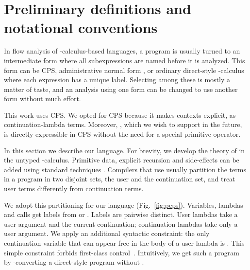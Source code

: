 \documentclass{LMCS}
\theoremstyle{definition} \newtheorem{property}[thm]{Property}
\begin{document}
\section{Preliminary definitions and notational conventions\label{sec:basics}}

\noindent In flow analysis of \lam-calculus-based languages, a program is usually turned
to an intermediate form where all subexpressions are named before it
is analyzed.  This form can be CPS, administrative normal form
\cite{conf/pldi/93/flanagan/anf}, or ordinary direct-style \lam-calculus where 
each expression has a unique label.
Selecting among these is mostly a matter of taste, and an analysis using one
form can be changed to use another form without much effort.

This work uses CPS.
We opted for CPS because it makes contexts explicit, as 
con\-tin\-u\-a\-tion-lambda terms.
Moreover, , which we wish to support in the future, is directly
expressible in CPS without the need for a special primitive operator.

In this section we describe our \cps{} language.
For brevity, we develop the theory of \cfat{} in the untyped \lam-calculus.
Primitive data, explicit recursion and side-effects can be added using standard
techniques \cite[ch.\ 3]{diss/cmu/91/olin} \cite[ch.\ 9]{diss/07/might/dcfa}.
Compilers that use \cps{} \cite{masters/mit/78/steel/rabbit,diss/yale/88/kranz}
usually partition the terms in a program in two disjoint sets, 
the user and the continuation set, 
and treat user terms differently from continuation terms.

We adopt this partitioning for our language (Fig.~\ref{fig:pcps}).
Variables, lambdas and calls get labels from \dulab{} or \dclab.
Labels are pairwise distinct.
User lambdas take a user argument and the current continuation;
continuation lambdas take only a user argument.
We apply an additional syntactic constraint: the only continuation variable
that can appear free in the body of a user lambda \pulam{} is .
This simple constraint forbids first-class 
control~\cite{conf/lfp/92/sabry/cps}.
Intuitively, we get such a program by \cps-converting a direct-style program
without .
\end{document}
